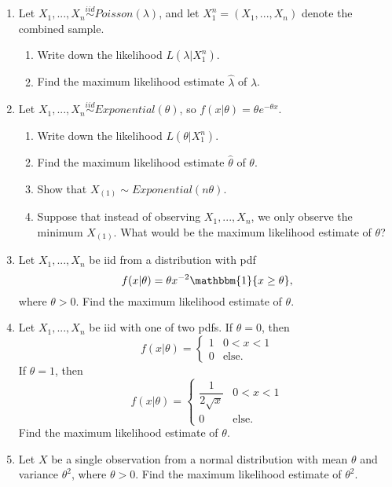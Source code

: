 \documentclass[11pt]{article}
\begin{document}
\begin{enumerate}
\item Let $X_1,...,X_n \overset{iid}{\sim} Poisson(\lambda)$, and let $X_1^n = (X_1,...,X_n)$ denote the combined sample.

\begin{enumerate}
\item Write down the likelihood $L(\lambda | X_1^n)$.

\item Find the maximum likelihood estimate $\widehat{\lambda}$ of $\lambda$.
\end{enumerate}

\item Let $X_1,...,X_n \overset{iid}{\sim} Exponential(\theta)$, so $f(x | \theta) = \theta e^{-\theta x}$.

\begin{enumerate}
\item Write down the likelihood $L(\theta | X_1^n)$.

\item Find the maximum likelihood estimate $\widehat{\theta}$ of $\theta$.

\item Show that $X_{(1)} \sim Exponential(n \theta)$.

\item Suppose that instead of observing $X_1,...,X_n$, we only observe the minimum $X_{(1)}$. What would be the maximum likelihood estimate of $\theta$?
\end{enumerate}

\item Let $X_1,...,X_n$ be iid from a distribution with pdf
$$f(x|\theta) = \theta x^{-2} \mathbbm{1}\{x \geq \theta \},$$
where $\theta > 0$. Find the maximum likelihood estimate of $\theta$.

\item Let $X_1,...,X_n$ be iid with one of two pdfs. If $\theta = 0$, then
$$f(x | \theta) = \begin{cases}
1 & 0 < x < 1 \\
0 & \text{else}.
\end{cases}$$
If $\theta = 1$, then
$$f(x | \theta) = \begin{cases}
\dfrac{1}{2 \sqrt{x}} & 0 < x < 1 \\
0 & \text{else}.
\end{cases}$$
Find the maximum likelihood estimate of $\theta$.

\item Let $X$ be a single observation from a normal distribution with mean $\theta$ and variance $\theta^2$, where $\theta > 0$. Find the maximum likelihood estimate of $\theta^2$.


\end{enumerate}
\end{document}
